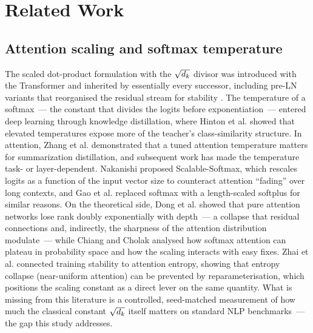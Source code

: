 \section{Related Work}\label{sec:related}

\subsection{Attention scaling and softmax temperature}
The scaled dot-product formulation with the $\sqrt{d_k}$ divisor was introduced
with the Transformer \cite{vaswani2017} and inherited by essentially every
successor, including pre-LN variants that reorganised the residual stream for
stability \cite{xiong2020,ba2016}. The temperature of a softmax~--- the constant
that divides the logits before exponentiation~--- entered deep learning through
knowledge distillation, where Hinton et al. \cite{hinton2015} showed that
elevated temperatures expose more of the teacher's class-similarity structure.
In attention, Zhang et al. \cite{zhang2022temp} demonstrated that a tuned
attention temperature matters for summarization distillation, and subsequent
work has made the temperature task- or layer-dependent. Nakanishi \cite{nakanishi2025}
proposed Scalable-Softmax, which rescales logits as a function of the input
vector size to counteract attention ``fading'' over long contexts, and Gao et
al. \cite{gao2025} replaced softmax with a length-scaled softplus for similar
reasons. On the theoretical side, Dong et al. \cite{dong2021} showed that pure
attention networks lose rank doubly exponentially with depth~--- a collapse that
residual connections and, indirectly, the sharpness of the attention
distribution modulate~--- while Chiang and Cholak \cite{chiang2022} analysed how
softmax attention can plateau in probability space and how the scaling interacts
with easy fixes. Zhai et al. \cite{zhai2023} connected training stability to
attention entropy, showing that entropy collapse (near-uniform attention) can be
prevented by reparameterisation, which positions the scaling constant as a
direct lever on the same quantity. What is missing from this literature is a
controlled, seed-matched measurement of how much the classical constant
$\sqrt{d_k}$ itself matters on standard NLP benchmarks~--- the gap this study
addresses.

